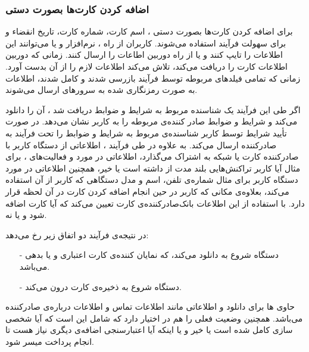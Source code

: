 \documentclass[oneside]{report}
\begin{document}
\subsubsection{اضافه کردن کارت‌ها بصورت دستی}
برای اضافه کردن کارت‌ها بصورت دستی ، اسم کارت، شماره کارت، تاریخ انقضاء و 
{\normalsize {}} 
برای سهولت فرآیند استفاده می‌شوند. کاربران از راه 
{\normalsize {}} 
، نرم‌افزار
{\normalsize {}}
و یا 
{\normalsize {}} 
می‌توانند این اطلاعات را تایپ کنند و یا از راه دوربین
{\normalsize {}} 
اطاعات را ارسال کنند.
زمانی که دوربین اطلاعات کارت را دریافت می‌کند،
{\normalsize {}}
تلاش می‌کند اطلاعات لازم را از آن بدست آورد. زمانی که تمامی فیلد‌های مربوطه  توسط فرآیند 
{\normalsize {}}
بازرسی شدند و 
کامل شدند،  اطلاعات به صورت رمزنگاری شده به سرور‌های 
{\normalsize {}} ارسال می‌شوند.

اگر طی این فرآیند یک شناسنده مربوط به شرایط و 	ضوابط دریافت شد ، 
{\normalsize {}}
آن را دانلود می‌کند و شرایط و ضوابط صادر کننده‌ی مربوطه را به کاربر نشان می‌دهد. در صورت تأیید شرایط توسط کاربر 
{\normalsize {}}
شناسنده‌ی مربوط به شرایط و ضوابط را تحت فرآیند 
{\normalsize {}}  
به صادرکننده ارسال می‌کند. به علاوه در طی فرآیند 
{\normalsize {}}، 
{\normalsize {}} 
اطلاعاتی از دستگاه کاربر با صادرکننده کارت یا شبکه به اشتراک می‌گذارد،  اطلاعاتی در مورد 
{\normalsize {}}
و فعالیت‌های 
{\normalsize {}}
، برای مثال آیا کاربر تراکنش‌هایی بلند مدت از 
{\normalsize {}}
داشته است یا خیر، همچنین اطلاعاتی در مورد دستگاه کاربر برای مثال شماره‌ی تلفن،  اسم و مدل دستگاهی که کاربر از آن استفاده می‌کند، بعلاوه‌ی مکانی که کاربر در حین انجام اضافه کردن کارت در آن لحظه قرار دارد. 
با استفاده از این اطلاعات بانک‌صادرکننده‌ی کارت تعیین می‌کند که آیا کارت اضافه شود و یا نه. 

در  نتیجه‌ی فرآیند 
{\normalsize {}} 
دو اتفاق زیر رخ می‌دهد:
\begin{itemize}
	\item[-] دستگاه شروع به دانلود  {\normalsize {}}   می‌کند، که نمایان کننده‌ی کارت اعتباری و یا بدهی می‌باشد.
	\item[-] دستگاه شروع به ذخیره‌ی کارت درون {\normalsize {}} می‌کند. 
\end{itemize}


{\normalsize {}} 
حاوی 
{\normalsize {}} ها
	برای دانلود 
	{\normalsize {}}
	و اطلاعاتی مانند اطلاعات تماس و اطلاعات درباره‌ی صادرکننده می‌باشد. همچنین وضعیت فعلی را هم در اختیار دارد که شامل این است که آیا شخصی سازی 
	{\normalsize {}}
	کامل شده است یا خیر و یا اینکه آیا اعتبارسنجی اضافه‌ی دیگری نیاز هست تا انجام پرداخت میسر شود.
	
\end{document}
